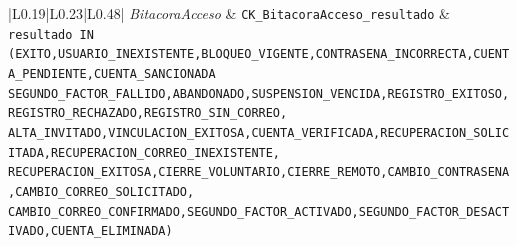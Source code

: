 \begin{center}
\begin{longtable}{|L{0.19\textwidth}|L{0.23\textwidth}|L{0.48\textwidth}|}
\textit{Bitacora\-Acceso} & \texttt{CK\_\allowbreak{}Bitacora\allowbreak{}Acceso\_\allowbreak{}resultado} & \texttt{resultado IN (\textquotesingle{}EXITO\textquotesingle{},\allowbreak{}\textquotesingle{}USUARIO\_\allowbreak{}INEXISTENTE\textquotesingle{},\allowbreak{}\textquotesingle{}BLOQUEO\_\allowbreak{}VIGENTE\textquotesingle{},\allowbreak{}\textquotesingle{}CONTRASENA\_\allowbreak{}INCORRECTA\textquotesingle{},\allowbreak{}\textquotesingle{}CUENTA\_\allowbreak{}PENDIENTE\textquotesingle{},\allowbreak{}\textquotesingle{}CUENTA\_\allowbreak{}SANCIONADA\textquotesingle{} \textquotesingle{}SEGUNDO\_\allowbreak{}FACTOR\_\allowbreak{}FALLIDO\textquotesingle{},\allowbreak{}\textquotesingle{}ABANDONADO\textquotesingle{},\allowbreak{}\textquotesingle{}SUSPENSION\_\allowbreak{}VENCIDA\textquotesingle{},\allowbreak{}\textquotesingle{}REGISTRO\_\allowbreak{}EXITOSO\textquotesingle{},\allowbreak{}\textquotesingle{}REGISTRO\_\allowbreak{}RECHAZADO\textquotesingle{},\allowbreak{}\textquotesingle{}REGISTRO\_\allowbreak{}SIN\_\allowbreak{}CORREO\textquotesingle{},\allowbreak{} \textquotesingle{}ALTA\_\allowbreak{}INVITADO\textquotesingle{},\allowbreak{}\textquotesingle{}VINCULACION\_\allowbreak{}EXITOSA\textquotesingle{},\allowbreak{}\textquotesingle{}CUENTA\_\allowbreak{}VERIFICADA\textquotesingle{},\allowbreak{}\textquotesingle{}RECUPERACION\_\allowbreak{}SOLICITADA\textquotesingle{},\allowbreak{}\textquotesingle{}RECUPERACION\_\allowbreak{}CORREO\_\allowbreak{}INEXISTENTE\textquotesingle{},\allowbreak{} \textquotesingle{}RECUPERACION\_\allowbreak{}EXITOSA\textquotesingle{},\allowbreak{}\textquotesingle{}CIERRE\_\allowbreak{}VOLUNTARIO\textquotesingle{},\allowbreak{}\textquotesingle{}CIERRE\_\allowbreak{}REMOTO\textquotesingle{},\allowbreak{}\textquotesingle{}CAMBIO\_\allowbreak{}CONTRASENA\textquotesingle{},\allowbreak{}\textquotesingle{}CAMBIO\_\allowbreak{}CORREO\_\allowbreak{}SOLICITADO\textquotesingle{},\allowbreak{} \textquotesingle{}CAMBIO\_\allowbreak{}CORREO\_\allowbreak{}CONFIRMADO\textquotesingle{},\allowbreak{}\textquotesingle{}SEGUNDO\_\allowbreak{}FACTOR\_\allowbreak{}ACTIVADO\textquotesingle{},\allowbreak{}\textquotesingle{}SEGUNDO\_\allowbreak{}FACTOR\_\allowbreak{}DESACTIVADO\textquotesingle{},\allowbreak{}\textquotesingle{}CUENTA\_\allowbreak{}ELIMINADA\textquotesingle{})} \\ \hline
\end{longtable}
\end{center}
